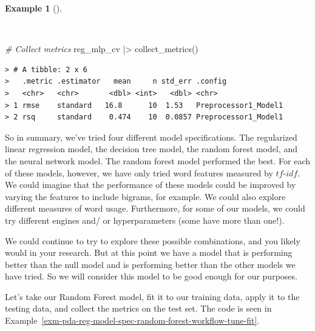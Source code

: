 \documentclass[
  letterpaper,
]{latex/krantz}
\newenvironment{Shaded}{\begin{snugshade}}{\end{snugshade}}
\newcommand{\CommentTok}[1]{\textcolor[rgb]{0.00,0.00,0.00}{\textit{#1}}}
\newcommand{\FunctionTok}[1]{\textcolor[rgb]{0.00,0.00,0.00}{#1}}
\newcommand{\NormalTok}[1]{\textcolor[rgb]{0.00,0.00,0.00}{#1}}
\newcommand{\SpecialCharTok}[1]{\textcolor[rgb]{0.00,0.00,0.00}{#1}}
\theoremstyle{definition}
\newtheorem{example}{Example}[chapter]
\theoremstyle{remark}
\begin{document}
\begin{example}[]\protect\hypertarget{exm-pda-reg-metrics-mlp}{}\label{exm-pda-reg-metrics-mlp}

~

\begin{Shaded}
\begin{Highlighting}[]
\CommentTok{\# Collect metrics}
\NormalTok{reg\_mlp\_cv }\SpecialCharTok{|\textgreater{}} \FunctionTok{collect\_metrics}\NormalTok{()}
\end{Highlighting}
\end{Shaded}

\begin{verbatim}
> # A tibble: 2 x 6
>   .metric .estimator   mean     n std_err .config             
>   <chr>   <chr>       <dbl> <int>   <dbl> <chr>               
> 1 rmse    standard   16.8      10  1.53   Preprocessor1_Model1
> 2 rsq     standard    0.474    10  0.0857 Preprocessor1_Model1
\end{verbatim}

\end{example}

So in summary, we've tried four different model specifications. The
regularized linear regression model, the decision tree model, the random
forest model, and the neural network model. The random forest model
performed the best. For each of these models, however, we have only
tried word features measured by \(tf\)-\(idf\). We could imagine that
the performance of these models could be improved by varying the
features to include bigrams, for example. We could also explore
different measures of word usage. Furthermore, for some of our models,
we could try different engines and/ or hyperparameters (some have more
than one!).

We could continue to try to explore these possible combinations, and you
likely would in your research. But at this point we have a model that is
performing better than the null model and is performing better than the
other models we have tried. So we will consider this model to be good
enough for our purposes.

Let's take our Random Forest model, fit it to our training data, apply
it to the testing data, and collect the metrics on the test set. The
code is seen in
Example~\ref{exm-pda-reg-model-spec-random-forest-workflow-tune-fit}.
\end{document}
